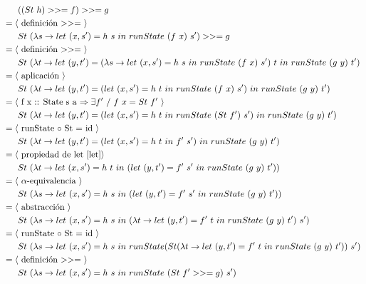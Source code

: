 \documentclass[a4paper,10pt]{article}
\begin{document}
	\begin{align*}
  &\ \ \ \ \ ((St\ h) >>= f) >>= g
  \\ &=\langle \text{ definición $>>=$ }\rangle
  \\ &\ \ \ \ \ St\ (\lambda s \rightarrow let\ (x,s')=h\ s\ in\ runState\ (f\ x)\ s') >>= g
  \\ &=\langle \text{ definición $>>=$ }\rangle
  \\ &\ \ \ \ \ St\ (\lambda t \rightarrow let\ (y, t')=(\lambda s \rightarrow let\ (x,s')=h\ s\ in\ runState\ (f\ x)\ s')\ t\ in\ runState\ (g\ y)\ t')
  \\ &=\langle \text{ aplicación }\rangle
  \\ &\ \ \ \ \ St\ (\lambda t \rightarrow let\ (y, t')=(let\ (x,s')= h\ t\ in\ runState\ (f\ x)\ s')\ in\ runState\ (g\ y)\ t')
  \\ &=\langle \text{ f x :: State s a $\Rightarrow \exists f'\ /\  f\ x = St\ f'$ \label{sec:fxl}}\rangle
  \\ &\ \ \ \ \ St\ (\lambda t \rightarrow let\ (y, t')=(let\ (x,s')= h\ t\ in\ runState\ (St\ f')\ s')\ in\ runState\ (g\ y)\ t')
  \\ &=\langle \text{ runState $\circ$ St = id }\rangle
  \\ &\ \ \ \ \ St\ (\lambda t \rightarrow let\ (y, t')=(let\ (x,s')= h\ t\ in\ f'\ s')\ in\ runState\ (g\ y)\ t')
  \\ &=\langle \text{ propiedad de let \ref{let}}\rangle
  \\ &\ \ \ \ \ St\ (\lambda t \rightarrow let\ (x,s')= h\ t\ in\ (let\ (y, t')=f'\ s'\ in\ runState\ (g\ y)\ t'))
  \\ &=\langle \text{ $\alpha$-equivalencia }\rangle
  \\ &\ \ \ \ \ St\ (\lambda s \rightarrow let\ (x,s')= h\ s\ in\ (let\ (y, t')=f'\ s'\ in\ runState\ (g\ y)\ t'))
  \\ &=\langle \text{ abstracción }\rangle
  \\ &\ \ \ \ \ St\ (\lambda s \rightarrow let\ (x,s')= h\ s\ in\ (\lambda t\rightarrow let\ (y, t')=f'\ t\ in\ runState\ (g\ y)\ t')\ s')
  \\ &=\langle \text{ runState $\circ$ St = id }\rangle
  \\ &\ \ \ \ \ St\ (\lambda s \rightarrow let\ (x,s')= h\ s\ in\ runState (St (\lambda t\rightarrow let\ (y, t')=f'\ t\ in\ runState\ (g\ y)\ t'))\ s')
  \\ &=\langle \text{ definición $>>=$ }\rangle
  \\ &\ \ \ \ \ St\ (\lambda s \rightarrow let\ (x,s')= h\ s\ in\ runState\ (St\ f' >>= g)\ s')

\end{align*}
\end{document}
